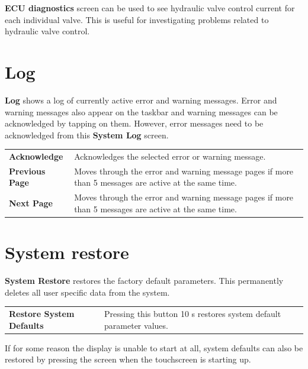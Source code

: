 \documentclass[12pt,a4paper,english]{uvmanual}
\begin{document}
\textbf{ECU diagnostics} screen can be used to see hydraulic valve control current for each individual valve. This is useful for investigating problems related to hydraulic valve control.

\section{Log}\label{ch:system_log}

\textbf{Log} shows a log of currently active error and warning messages. Error and warning messages also appear on the taskbar and warning messages can be acknowledged by tapping on them. However, error messages need to be acknowledged from this \textbf{System Log} screen. 


\begin{tabular}{ L{0.2\textwidth} L{0.66\textwidth} }
\textbf{Acknowledge} & Acknowledges the selected error or warning message. \\
\textbf{Previous Page} & Moves through the error and warning message pages if more than 5 messages are active at the same time. \\
\textbf{Next Page} & Moves through the error and warning message pages if more than 5 messages are active at the same time. \\
\end{tabular}



\section{System restore}\label{ch:system_restore}

\textbf{System Restore} restores the factory default parameters. This permanently deletes all user specific data from the system.


\begin{tabular}{ L{0.2\textwidth} L{0.66\textwidth} }
\textbf{Restore System Defaults} & Pressing this button 10 s restores system default parameter values. \\
\end{tabular}


If for some reason the display is unable to start at all, system defaults can also be restored by pressing the screen when the touchscreen is starting up.
\end{document}
